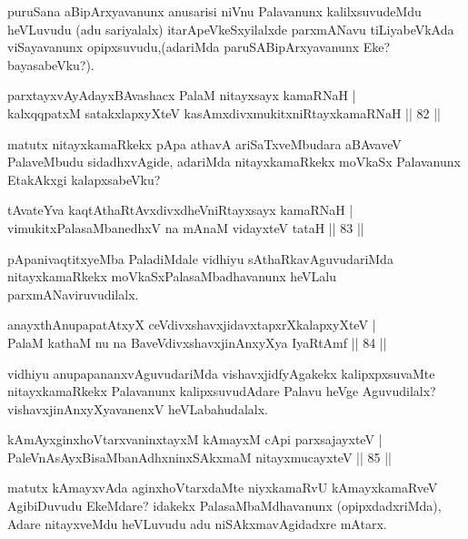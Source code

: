 \begin{artha}
puruSana aBipArxyavanunx anusarisi niVnu Palavanunx kalilxsuvudeMdu heVLuvudu (adu 
sariyalalx) itarApeVkeSxyilalxde parxmANavu tiLiyabeVkAda viSayavanunx 
opipxsuvudu,(adariMda paruSABipArxyavanunx Eke?bayasabeVku?).
\end{artha}

\begin{shl}
parxtayxvAyAdayxBAvashacx PalaM nitayxsayx kamaRNaH |\\
kalxqqpatxM satakxlapxyXteV kasAmxdivxmukitxniRtayxkamaRNaH \hfill || 82 ||
\end{shl}
	
\begin{artha}
matutx nitayxkamaRkekx pApa athavA ariSaTxveMbudara aBAvaveV PalaveMbudu sidadhxvAgide, adariMda nitayxkamaRkekx moVkaSx Palavanunx EtakAkxgi kalapxsabeVku?
\end{artha}

\begin{shl}
tAvateYva kaqtAthaRtAvxdivxdheVniRtayxsayx kamaRNaH |\\
vimukitxPalasaMbanedhxV na mAnaM vidayxteV tataH \hfill || 83 ||
\end{shl}

\begin{artha}
pApanivaqtitxyeMba PaladiMdale vidhiyu sAthaRkavAguvudariMda nitayxkamaRkekx moVkaSxPalasaMbadhavanunx heVLalu parxmANaviruvudilalx.
\end{artha}

\begin{shl}
anayxthA\s nupapatAtxyX ceVdivxshavxjidavxtapxrXkalapxyXteV |\\
PalaM kathaM nu na BaveVdivxshavxjinAnxyXya IyaRtAmf \hfill || 84 ||
\end{shl}

\begin{artha}
vidhiyu anupapananxvAguvudariMda vishavxjidfyAgakekx kalipxpxsuvaMte nitayxkamaRkekx Palavanunx kalipxsuvudAdare Palavu heVge Aguvudilalx? vishavxjinAnxyXyavanenxV heVLabahudalalx.
\end{artha}

\begin{shl}
kAmAyxginxhoVtarxvaninxtayxM kAmayxM cApi parxsajayxteV |\\
PaleVnAsAyxBisaMbanAdhxninxSAkxmaM nitayxmucayxteV \hfill || 85 ||
\end{shl}

\begin{artha}
matutx kAmayxvAda aginxhoVtarxdaMte niyxkamaRvU kAmayxkamaRveV AgibiDuvudu EkeMdare? idakekx PalasaMbaMdhavanunx (opipxdadxriMda), Adare nitayxveMdu heVLuvudu adu niSAkxmavAgidadxre mAtarx.
\end{artha}

